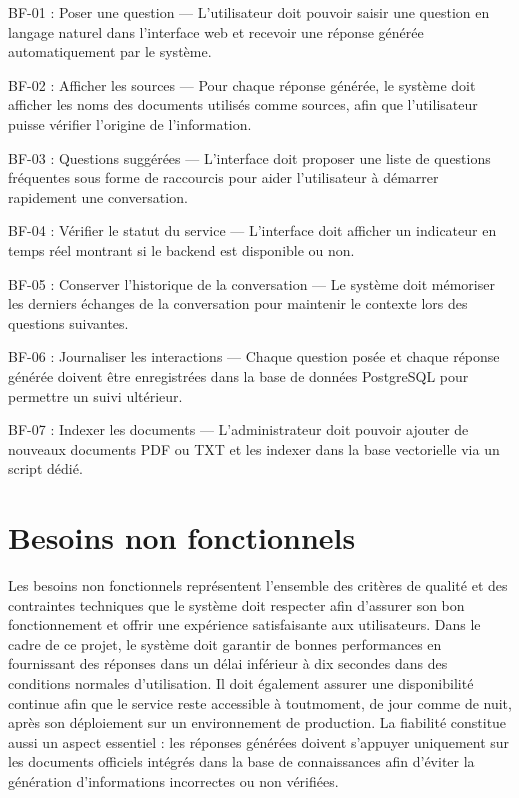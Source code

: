 \documentclass[12pt, a4paper, twoside]{report}
\begin{document}
BF-01 : Poser une question — L'utilisateur doit pouvoir saisir une question en langage naturel dans l'interface web et recevoir une réponse générée automatiquement par le système.

BF-02 : Afficher les sources — Pour chaque réponse générée, le système doit afficher les noms des documents utilisés comme sources, afin que l'utilisateur puisse vérifier l'origine de l'information.

BF-03 : Questions suggérées — L'interface doit proposer une liste de questions fréquentes sous forme de raccourcis pour aider l'utilisateur à démarrer rapidement une conversation.

BF-04 : Vérifier le statut du service — L'interface doit afficher un indicateur en temps réel montrant si le backend est disponible ou non.

BF-05 : Conserver l'historique de la conversation — Le système doit mémoriser les derniers échanges de la conversation pour maintenir le contexte lors des questions suivantes.

BF-06 : Journaliser les interactions — Chaque question posée et chaque réponse générée doivent être enregistrées dans la base de données PostgreSQL pour permettre un suivi ultérieur.

BF-07 : Indexer les documents — L'administrateur doit pouvoir ajouter de nouveaux documents PDF ou TXT et les indexer dans la base vectorielle via un script dédié.

\newpage
\section{Besoins non fonctionnels}
Les besoins non fonctionnels représentent l’ensemble des critères de qualité et des contraintes techniques que le système doit respecter afin d’assurer son bon \newline fonctionnement et offrir une expérience satisfaisante aux utilisateurs. Dans le cadre de ce projet, le système doit garantir de bonnes performances en fournissant des réponses dans un délai inférieur à dix secondes dans des conditions normales d’utilisation. Il doit également assurer une disponibilité continue afin que le service reste accessible à tout\newline moment, de jour comme de nuit, après son déploiement sur un environnement de \newline production. La fiabilité constitue aussi un aspect essentiel : les réponses générées doivent s’appuyer uniquement sur les documents officiels intégrés dans la base de connaissances afin d’éviter la génération d’informations incorrectes ou non vérifiées.
\end{document}
